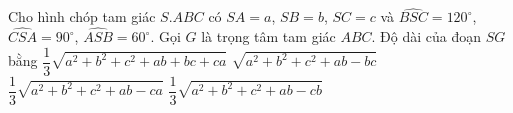 \begin{ex}%
	Cho hình chóp tam giác $S.ABC$ có $SA=a$, $SB=b$, $SC=c$ và $\widehat{BSC}=120^\circ$, $\widehat{CSA}=90^\circ$, $\widehat{ASB}=60^\circ$. Gọi $G$ là trọng tâm tam giác $ABC$. Độ dài của đoạn $SG$ bằng
	\choice
	{$\dfrac{1}{3}\sqrt{a^2+b^2+c^2+ab+bc+ca}$}
	{ $\sqrt{a^2+b^2+c^2+ab-bc}$}
	{$\dfrac{1}{3}\sqrt{a^2+b^2+c^2+ab-ca}$}
	{\True $\dfrac{1}{3}\sqrt{a^2+b^2+c^2+ab-cb}$}
\end{ex}